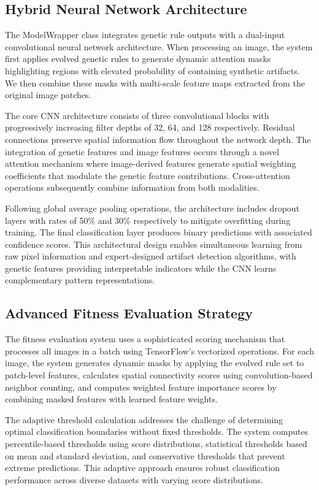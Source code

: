 \documentclass[runningheads]{llncs}
\begin{document}
\subsection{Hybrid Neural Network Architecture}
The ModelWrapper class integrates genetic rule outputs with a dual-input convolutional neural network architecture. When processing an image, the system first applies evolved genetic rules to generate dynamic attention masks highlighting regions with elevated probability of containing synthetic artifacts. We then combine these masks with multi-scale feature maps extracted from the original image patches.

The core CNN architecture consists of three convolutional blocks with progressively increasing filter depths of 32, 64, and 128 respectively. Residual connections preserve spatial information flow throughout the network depth. The integration of genetic features and image features occurs through a novel attention mechanism where image-derived features generate spatial weighting coefficients that modulate the genetic feature contributions. Cross-attention operations subsequently combine information from both modalities.

Following global average pooling operations, the architecture includes dropout layers with rates of 50\% and 30\% respectively to mitigate overfitting during training. The final classification layer produces binary predictions with associated confidence scores. This architectural design enables simultaneous learning from raw pixel information and expert-designed artifact detection algorithms, with genetic features providing interpretable indicators while the CNN learns complementary pattern representations.

\subsection{Advanced Fitness Evaluation Strategy}
The fitness evaluation system uses a sophisticated scoring mechanism that processes all images in a batch using TensorFlow's vectorized operations. For each image, the system generates dynamic masks by applying the evolved rule set to patch-level features, calculates spatial connectivity scores using convolution-based neighbor counting, and computes weighted feature importance scores by combining masked features with learned feature weights.

The adaptive threshold calculation addresses the challenge of determining optimal classification boundaries without fixed thresholds. The system computes percentile-based thresholds using score distributions, statistical thresholds based on mean and standard deviation, and conservative thresholds that prevent extreme predictions. This adaptive approach ensures robust classification performance across diverse datasets with varying score distributions.
\end{document}
